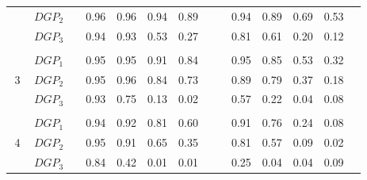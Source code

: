 \begin{table}[htbp]
{\begin{tabular}{cc|ccccccc|cccccc|}
    \multicolumn{2}{c|}{} & \multicolumn{1}{l}{$DGP_{2}$} & & \multicolumn{1}{c}{0.96} & \multicolumn{1}{c}{0.96} & \multicolumn{1}{c}{0.94} & \multicolumn{1}{c}{0.89} & & & \multicolumn{1}{c}{0.94} & \multicolumn{1}{c}{0.89} & \multicolumn{1}{c}{0.69} & \multicolumn{1}{c}{0.53} & \\
    \multicolumn{2}{c|}{} & \multicolumn{1}{l}{$DGP_{3}$} & & \multicolumn{1}{c}{0.94} & \multicolumn{1}{c}{0.93} & \multicolumn{1}{c}{0.53} & \multicolumn{1}{c}{0.27} & & & \multicolumn{1}{c}{0.81} & \multicolumn{1}{c}{0.61} & \multicolumn{1}{c}{0.20} & \multicolumn{1}{c}{0.12} & \\
    & & & & & & & & & & & & & & \\
    \multicolumn{2}{c|}{\multirow{3}{*}{3}} & \multicolumn{1}{l}{$DGP_{1}$} & & \multicolumn{1}{c}{0.95} & \multicolumn{1}{c}{0.95} & \multicolumn{1}{c}{0.91} & \multicolumn{1}{c}{0.84} & & & \multicolumn{1}{c}{0.95} & \multicolumn{1}{c}{0.85} & \multicolumn{1}{c}{0.53} & \multicolumn{1}{c}{0.32} & \\
    \multicolumn{2}{c|}{} & \multicolumn{1}{l}{$DGP_{2}$} & & \multicolumn{1}{c}{0.95} & \multicolumn{1}{c}{0.96} & \multicolumn{1}{c}{0.84} & \multicolumn{1}{c}{0.73} & & & \multicolumn{1}{c}{0.89} & \multicolumn{1}{c}{0.79} & \multicolumn{1}{c}{0.37} & \multicolumn{1}{c}{0.18} & \\
    \multicolumn{2}{c|}{} & \multicolumn{1}{l}{$DGP_{3}$} & & \multicolumn{1}{c}{0.93} & \multicolumn{1}{c}{0.75} & \multicolumn{1}{c}{0.13} & \multicolumn{1}{c}{0.02} & & & \multicolumn{1}{c}{0.57} & \multicolumn{1}{c}{0.22} & \multicolumn{1}{c}{0.04} & \multicolumn{1}{c}{0.08} & \\
    & & & & & & & & & & & & & & \\
    \multicolumn{2}{c|}{\multirow{3}{*}{4}} & \multicolumn{1}{l}{$DGP_{1}$} & & \multicolumn{1}{c}{0.94} & \multicolumn{1}{c}{0.92} & \multicolumn{1}{c}{0.81} & \multicolumn{1}{c}{0.60} & & & \multicolumn{1}{c}{0.91} & \multicolumn{1}{c}{0.76} & \multicolumn{1}{c}{0.24} & \multicolumn{1}{c}{0.08} & \\
    \multicolumn{2}{c|}{} & \multicolumn{1}{l}{$DGP_{2}$} & & \multicolumn{1}{c}{0.95} & \multicolumn{1}{c}{0.91} & \multicolumn{1}{c}{0.65} & \multicolumn{1}{c}{0.35} & & & \multicolumn{1}{c}{0.81} & \multicolumn{1}{c}{0.57} & \multicolumn{1}{c}{0.09} & \multicolumn{1}{c}{0.02} & \\
    \multicolumn{2}{c|}{} & \multicolumn{1}{l}{$DGP_{3}$} & & \multicolumn{1}{c}{0.84} & \multicolumn{1}{c}{0.42} & \multicolumn{1}{c}{0.01} & \multicolumn{1}{c}{0.01} & & & \multicolumn{1}{c}{0.25} & \multicolumn{1}{c}{0.04} & \multicolumn{1}{c}{0.04} & \multicolumn{1}{c}{0.09} & \\

\end{tabular}}
\end{table}
